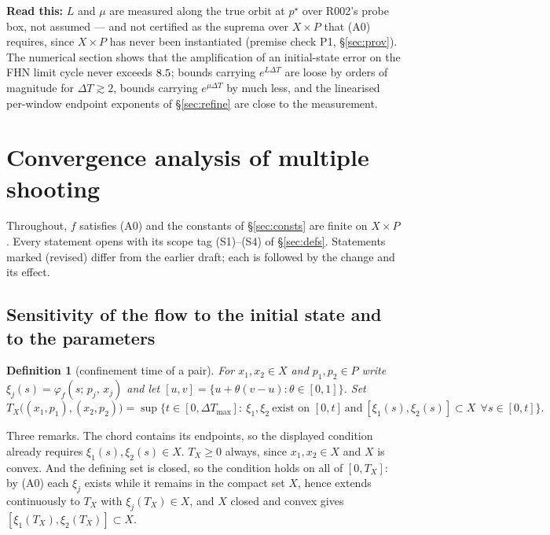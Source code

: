 \documentclass[11pt]{article}
\newtheorem{definition}{Definition}
\theoremstyle{remark}\newtheorem{remark}{Remark}
\newcommand{\pstar}{p^\star}
\newcommand{\flow}[3]{\varphi_f(#1;\,#2,\,#3)}
\newcommand{\readthis}[1]{\textbf{Read this:} #1}
\newcommand{\rev}[1]{\textcolor{blue!55!black}{#1}}
\begin{document}
\readthis{$L$ and $\mu$ are measured along the true orbit at $\pstar$ over R002's probe box, not assumed --- and not certified as the suprema over $X\times P$ that (A0) requires, since $X\times P$ has never been instantiated (premise check P1, \S\ref{sec:prov}). The numerical section shows that the amplification of an initial-state error on the FHN limit cycle never exceeds $8.5$; bounds carrying $e^{L\Delta T}$ are loose by orders of magnitude for $\Delta T\gtrsim2$, bounds carrying $e^{\mu\Delta T}$ by much less, and the linearised per-window endpoint exponents of \S\ref{sec:refine} are close to the measurement.}

\section{Convergence analysis of multiple shooting}\label{sec:theory}
Throughout, $f$ satisfies (A0) and the constants of \S\ref{sec:consts} are finite on $X\times P$. Every statement opens with its scope tag (S1)--(S4) of \S\ref{sec:defs}. Statements marked \rev{(revised)} differ from the earlier draft; each is followed by the change and its effect.

\subsection{Sensitivity of the flow to the initial state and to the parameters}\label{sec:lemma1}

\begin{definition}[confinement time of a pair]\label{def:Tx}
For $x_1,x_2\in X$ and $p_1,p_2\in P$ write $\xi_j(s)=\flow{s}{p_j}{x_j}$ and let $[u,v]=\{u+\theta(v-u):\theta\in[0,1]\}$. Set
\[
T_X\big((x_1,p_1),(x_2,p_2)\big)
=\sup\Big\{t\in[0,\Delta T_{\max}]:\ \xi_1,\xi_2\ \text{exist on }[0,t]\ \text{and}\
[\xi_1(s),\xi_2(s)]\subset X\ \ \forall s\in[0,t]\Big\}.
\]
\end{definition}
\noindent
Three remarks. The chord contains its endpoints, so the displayed condition already requires $\xi_1(s),\xi_2(s)\in X$. $T_X\ge0$ always, since $x_1,x_2\in X$ and $X$ is convex. And the defining set is closed, so the condition holds on all of $[0,T_X]$: by (A0) each $\xi_j$ exists while it remains in the compact set $X$, hence extends continuously to $T_X$ with $\xi_j(T_X)\in X$, and $X$ closed and convex gives $[\xi_1(T_X),\xi_2(T_X)]\subset X$.
\end{document}
